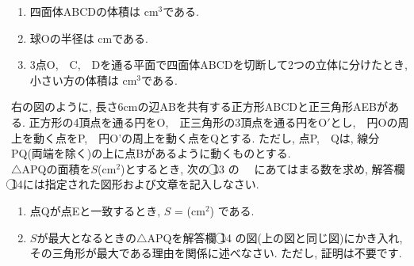 \documentclass[dvipdfmx, titlepage, 11pt]{jsarticle}
\newcommand{\ncircle}[1]{\textcircled{\scriptsize #1}}
\newcommand{\nbox}[1]{\fbox{\hspace{5pt} \textcircled{\scriptsize #1}\hspace{5pt} }}
\newcommand{\ebox}{\fbox{　\hspace{10pt} }}
\begin{document}
\begin{enumerate}[(1)]
\item 四面体ABCDの体積は \nbox{10} cm${}^{3}$である.
  \newpage
\item 球Oの半径は \nbox{11} cmである.\\[7cm]
\item 3点O,\ \ C,\ \ Dを通る平面で四面体ABCDを切断して2つの立体に分けたとき, 小さい方の体積は \nbox{12} cm${}^{3}$である.
\end{enumerate}
\newpage
\begin{multicols}{2}
  \noindent {}\hspace{10pt} 右の図のように, 長さ6cmの辺ABを共有する正方形ABCDと正三角形AEBがある. 正方形の4頂点を通る円をO,\ \ 正三角形の3頂点を通る円をO$'$とし,\ \ 円Oの周上を動く点をP,\ \ 円O'の周上を動く点をQとする. ただし, 点P,\ \ Qは, 線分PQ(両端を除く)の上に点Bがあるように動くものとする. \\
  $\triangle$APQの面積を$S$(cm${}^{2}$)とするとき, 次の \ncircle{13} の \ebox \ \ にあてはまる数を求め, 解答欄 \ncircle{14}には指定された図形および文章を記入しなさい.
  \begin{center}
  \end{center}
\end{multicols}
\begin{enumerate}[(1)]
\item 点Qが点Eと一致するとき, $S$ = \nbox{13} (cm${}^{2}$) である.\\[5cm]
\item $S$が最大となるときの$\triangle$APQを解答欄 \ncircle{14} の図(上の図と同じ図)にかき入れ, その三角形が最大である理由を関係に述べなさい. ただし, 証明は不要です.
\end{enumerate}
\newpage
\thispagestyle{empty}
　
\newpage
\newpage
\thispagestyle{empty}
　
\newpage
\end{document}
